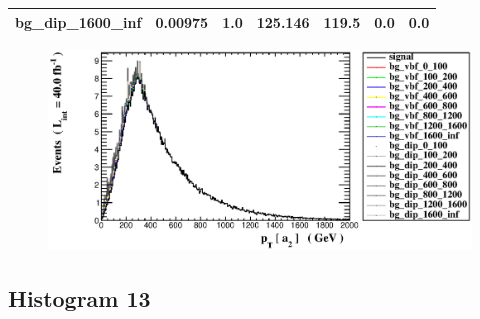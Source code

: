 \documentclass[a4paper, 10pt]{article}
\begin{document}
\begin{table}[H]
\begin{center}
\begin{tabular}{|m{23.0mm}|m{23.0mm}|m{18.0mm}|m{19.0mm}|m{19.0mm}|m{19.0mm}|m{19.0mm}|}
      \hline
      {\cellcolor{white}         bg\_dip\_1600\_inf}& {\cellcolor{white}         0.00975}& {\cellcolor{white}         1.0}& {\cellcolor{white}         125.146}& {\cellcolor{white}         119.5}& {\cellcolor{green}         0.0}& {\cellcolor{green}         0.0}\\
\hline
    \end{tabular}
  \end{center}
\end{table}

\begin{figure}[H]
  \begin{center}
    \includegraphics[scale=0.45]{selection_11.eps}\\
\caption{   }
  \end{center}
\end{figure}
      \newpage
\subsection{ Histogram 13}
\end{document}
